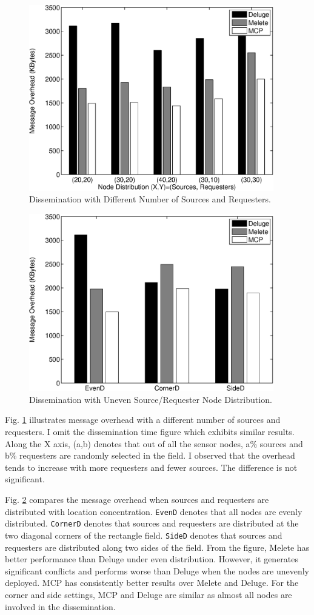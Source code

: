 \begin{figure}[htbp]
\centering
\includegraphics[width=4.2in]{figures/fdist1.eps}
\caption{Dissemination with Different Number of Sources and Requesters.}
\label{fsr}
\end{figure}

\begin{figure}[htbp]
\centering
\includegraphics[width=4.2in]{figures/fdist3.eps}
\caption{Dissemination with Uneven Source/Requester Node Distribution.}
\label{floc}
\end{figure}

Fig. \ref{fsr} illustrates message overhead with a different number of sources and requesters. I omit the dissemination time figure which exhibits similar results.
Along the X axis, (a,b) denotes that out of all the sensor nodes, a\% sources and b\% requesters are randomly selected in the field. I observed that the overhead tends to increase with more requesters and fewer sources. The difference is not significant.


Fig. \ref{floc} compares the message overhead when sources and requesters are distributed with location concentration. {\tt EvenD} denotes that all nodes are evenly distributed. {\tt CornerD} denotes that sources and requesters are distributed at the two diagonal corners of the rectangle field. {\tt SideD} denotes that sources and requesters are distributed along two sides of the field. From the figure, Melete has better performance than Deluge under even distribution. However, it generates significant conflicts and performs worse than Deluge when the nodes are unevenly deployed. MCP has consistently better results over Melete and Deluge. For the corner and side settings, MCP and Deluge are similar as almost all nodes are involved in the dissemination. 


